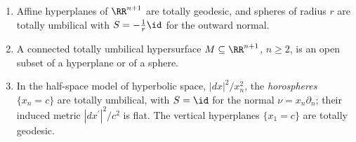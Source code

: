 \begin{proposition}\label{riemannian-geometry:proposition-umbilical}
\begin{enumerate}
\item Affine hyperplanes of $\RR^{n+1}$ are totally geodesic, and spheres of radius $r$ are totally umbilical with $S = -\frac1r\id$ for the outward normal.
\item A connected totally umbilical hypersurface $M \subseteq \RR^{n+1}$, $n \geq 2$, is an open subset of a hyperplane or of a sphere.
\item In the half-space model of hyperbolic space, $|dx|^2/x_n^2$, the \emph{horospheres} $\{x_n = c\}$ are totally umbilical, with $S = \id$ for the normal $\nu = x_n\partial_n$; their induced metric
$|dx^{\prime}|^2/c^2$ is flat. The vertical hyperplanes $\{x_1 = c\}$ are totally geodesic.
\end{enumerate}
\end{proposition}

